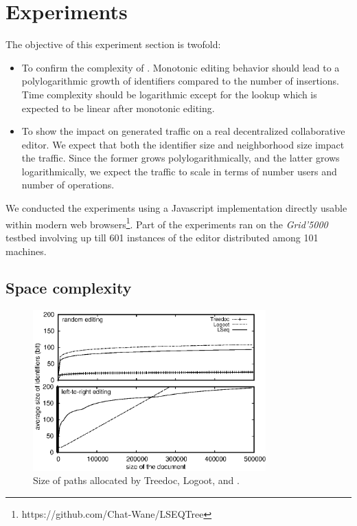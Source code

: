 \section{Experiments}
\label{sec:experiments}

The objective of this experiment section is twofold:
\begin{itemize}
\item To confirm the complexity of \LSEQ. Monotonic editing behavior should lead
  to a polylogarithmic growth of identifiers compared to the number of
  insertions. Time complexity should be logarithmic except for the lookup which
  is expected to be linear after monotonic editing.
\item To show the impact on generated traffic on a real decentralized
  collaborative editor. We expect that both the identifier size and neighborhood
  size impact the traffic. Since the former grows polylogarithmically, and the
  latter grows logarithmically, we expect the traffic to scale in terms of
  number users and number of operations.
\end{itemize}

We conducted the experiments using a Javascript implementation directly usable
within modern web browsers\footnote{https://github.com/Chat-Wane/LSEQTree}. Part
of the experiments ran on the \emph{Grid'5000} testbed involving up till 601
instances of the editor distributed among 101 machines.

\subsection{Space complexity}

\begin{figure}
  \centering
  \includegraphics[width=0.8\textwidth]{./img/complexity.eps}
  \caption{\label{fig:complexity}Size of paths allocated by Treedoc, Logoot, and
    \LSEQ.}
\end{figure}


